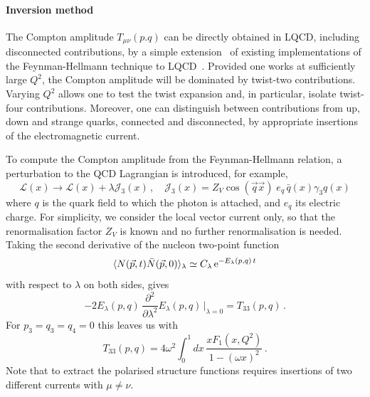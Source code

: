 \paragraph*{Inversion method}
\label{Sec:InversionMethod}

The Compton amplitude $T_{\mu\nu}(p.q)$ can be directly obtained in LQCD, including disconnected contributions,  by a simple extension~\cite{Chambers:2017dov} of existing implementations of the Feynman-Hellmann technique to LQCD~\cite{Horsley:2012pz,Chambers:2014qaa,Chambers:2015bka}. Provided one works at sufficiently large $Q^2$, the Compton amplitude will be dominated by twist-two contributions. Varying $Q^2$ allows one to test the twist expansion and, in particular, isolate twist-four contributions. Moreover, one can distinguish between contributions from up, down and strange quarks, connected and disconnected, by appropriate insertions of the electromagnetic current.

To compute the Compton amplitude from the Feynman-Hellmann relation, a perturbation to the QCD Lagrangian is introduced, for example,
\begin{equation}
\mathcal{L}(x) \rightarrow \mathcal{L}(x) + \lambda \mathcal{J}_3(x)\,, \quad \mathcal{J}_3(x)=Z_V\cos(\vec{q}\vec{x})\; e_q \,\bar{q}(x)\gamma_3 q(x) 
\label{in}
\end{equation}
where $q$ is the quark field to which the photon is attached, and $e_q$ its electric charge. For simplicity, we consider the local vector current only, so that the renormalisation factor $Z_V$ is known and no further renormalisation is needed. Taking the second derivative of the nucleon two-point function 
\begin{equation}
\langle N(\vec{p},t) \bar{N}(\vec{p},0)\rangle_\lambda \simeq C_\lambda\, {\rm e}^{-E_\lambda(p,q)\,t}
\end{equation}
with respect to $\lambda$ on both sides, gives
\begin{equation}
-2 E_\lambda(p,q)\, \frac{\partial^2}{\partial\lambda^2}  E_\lambda(p,q)\,\big|_{\lambda=0} = T_{33}(p,q) \,.
\end{equation}
For $p_3=q_3=q_4=0$ this leaves us with
\begin{equation}
T_{33}(p,q) = 4 \omega^2 \int_0^1 dx\,  \frac{xF_1(x,Q^2)}{1-(\omega x)^2} \,.
\label{ff}
\end{equation}
Note that to extract the polarised structure functions requires insertions of two different currents with $\mu\neq \nu$.  

